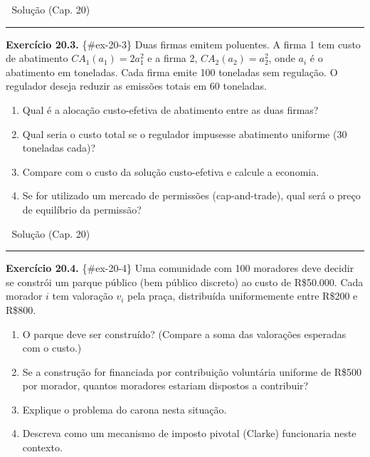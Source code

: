 \documentclass[11pt,twoside,openright]{book}
\providecommand{\tightlist}{\setlength{\itemsep}{0pt}\setlength{\parskip}{0pt}}
\begin{document}
🔑 Solução (Cap. 20)

\begin{center}\rule{0.5\linewidth}{0.5pt}\end{center}

\textbf{Exercício 20.3.} \{\#ex-20-3\} Duas firmas emitem poluentes. A
firma 1 tem custo de abatimento \(CA_1(a_1) = 2a_1^2\) e a firma 2,
\(CA_2(a_2) = a_2^2\), onde \(a_i\) é o abatimento em toneladas. Cada
firma emite 100 toneladas sem regulação. O regulador deseja reduzir as
emissões totais em 60 toneladas.

\begin{enumerate}
\def\labelenumi{(\alph{enumi})}
\tightlist
\item
  Qual é a alocação custo-efetiva de abatimento entre as duas firmas?
\item
  Qual seria o custo total se o regulador impusesse abatimento uniforme
  (30 toneladas cada)?
\item
  Compare com o custo da solução custo-efetiva e calcule a economia.
\item
  Se for utilizado um mercado de permissões (cap-and-trade), qual será o
  preço de equilíbrio da permissão?
\end{enumerate}

🔑 Solução (Cap. 20)

\begin{center}\rule{0.5\linewidth}{0.5pt}\end{center}

\textbf{Exercício 20.4.} \{\#ex-20-4\} Uma comunidade com 100 moradores
deve decidir se constrói um parque público (bem público discreto) ao
custo de R\$50.000. Cada morador \(i\) tem valoração \(v_i\) pela praça,
distribuída uniformemente entre R\$200 e R\$800.

\begin{enumerate}
\def\labelenumi{(\alph{enumi})}
\tightlist
\item
  O parque deve ser construído? (Compare a soma das valorações esperadas
  com o custo.)
\item
  Se a construção for financiada por contribuição voluntária uniforme de
  R\$500 por morador, quantos moradores estariam dispostos a contribuir?
\item
  Explique o problema do carona nesta situação.
\item
  Descreva como um mecanismo de imposto pivotal (Clarke) funcionaria
  neste contexto.
\end{enumerate}
\end{document}

